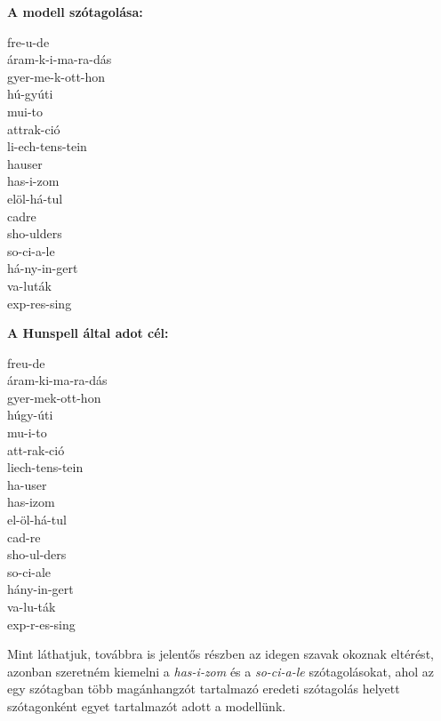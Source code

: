 \documentclass[a4paper, magyar]{article}
\begin{document}
\hfill
\begin{minipage}{0.4\textwidth}
	\textbf{A modell szótagolása:}
	
	fre-u-de\\
	áram-k-i-ma-ra-dás \\
	gyer-me-k-ott-hon \\
	hú-gyúti\\
	mui-to\\
	attrak-ció\\
	li-ech-tens-tein\\
	hauser\\
	has-i-zom\\
	elöl-há-tul\\
	cadre\\
	sho-ulders\\
	so-ci-a-le\\
	há-ny-in-gert\\
	va-luták\\
	exp-res-sing
\end{minipage}\hfill
\begin{minipage}{0.4\textwidth}
	\textbf{A Hunspell által adot cél:}
	
	freu-de\\
	áram-ki-ma-ra-dás\\
	gyer-mek-ott-hon\\
	húgy-úti\\
	mu-i-to\\
	att-rak-ció\\
	liech-tens-tein\\
	ha-user\\
	has-izom\\
	el-öl-há-tul\\
	cad-re\\
	sho-ul-ders\\
	so-ci-ale\\
	hány-in-gert\\
	va-lu-ták\\
	exp-r-es-sing
\end{minipage}\hfill
\medskip

Mint láthatjuk, továbbra is jelentős részben az idegen szavak okoznak eltérést, azonban szeretném kiemelni a \textit{has-i-zom} és a \textit{so-ci-a-le} szótagolásokat, ahol az egy szótagban több magánhangzót tartalmazó eredeti szótagolás helyett szótagonként egyet tartalmazót adott a modellünk.
\end{document}

